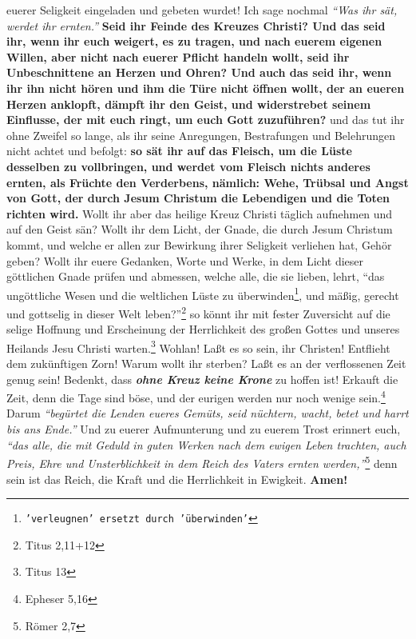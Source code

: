 euerer Seligkeit eingeladen und gebeten wurdet! Ich sage nochmal
\textit{"`Was ihr sät, werdet ihr ernten."'}
\label{ref:18_11_feinde_des_kreuzes}
\textbf{Seid ihr Feinde des Kreuzes Christi? Und das seid
ihr, wenn ihr euch weigert, es zu tragen, und nach euerem eigenen Willen, aber
nicht nach euerer Pflicht handeln wollt, seid ihr
Unbeschnittene an Herzen und
Ohren? Und auch das seid ihr, wenn ihr ihn nicht hören und ihm die Türe nicht
öffnen wollt, der an eueren Herzen anklopft, dämpft ihr den Geist, und
widerstrebet seinem Einflusse, der mit euch ringt, um euch Gott zuzuführen?}
und das tut ihr ohne Zweifel so lange, als ihr seine Anregungen, Bestrafungen
und Belehrungen nicht achtet und befolgt: \textbf{so sät ihr auf das Fleisch,
um die
Lüste desselben zu vollbringen, und werdet vom Fleisch nichts anderes ernten,
als Früchte den Verderbens, nämlich: Wehe, Trübsal und Angst von Gott, der durch
Jesum Christum die Lebendigen und die Toten richten wird.} Wollt ihr aber
das heilige Kreuz Christi täglich aufnehmen und auf den Geist sän? Wollt ihr
dem Licht, der Gnade, die durch Jesum Christum kommt, und welche er allen
zur Bewirkung ihrer Seligkeit verliehen hat, Gehör geben? Wollt ihr euere
Gedanken, Worte und Werke, in dem Licht dieser göttlichen
Gnade prüfen und
abmessen, welche alle, die sie lieben, lehrt,
"`das ungöttliche Wesen und die
weltlichen Lüste zu überwinden\footnote{\texttt{'verleugnen' ersetzt durch
'überwinden'}}, und mäßig, gerecht
und gottselig in dieser Welt
leben?"'\footnote{Titus 2,11+12}
so könnt ihr mit fester Zuversicht auf
die selige Hoffnung und Erscheinung der Herrlichkeit des großen Gottes und
unseres Heilands Jesu Christi warten.\footnote{Titus 13}
Wohlan! Laßt es so
sein, ihr Christen! Entflieht dem zukünftigen Zorn! Warum wollt ihr sterben?
Laßt es an der verflossenen Zeit genug sein! Bedenkt, dass \textbf{\textit{ohne
Kreuz keine
Krone}} zu hoffen ist! Erkauft die Zeit, denn die
Tage sind böse, und der
eurigen werden nur noch wenige sein.\footnote{Epheser 5,16}
Darum
\textit{"`begürtet die
Lenden eueres Gemüts, seid nüchtern, wacht, betet und harrt bis ans
Ende."'}
Und zu euerer Aufmunterung und zu euerem Trost erinnert euch,
\textit{"`das alle, die mit
Geduld in guten Werken nach dem ewigen Leben trachten, auch Preis, Ehre und
Unsterblichkeit in dem Reich des Vaters ernten werden,"'}\footnote{Römer 2,7}
denn sein ist das Reich, die Kraft und die Herrlichkeit in Ewigkeit.
\textbf{Amen!}


